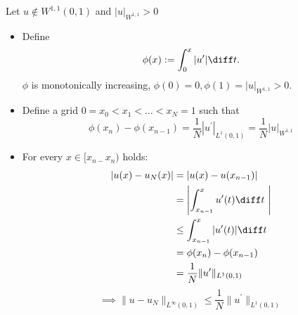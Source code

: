 \begin{example}
\begin{enumerate}[label = \Roman*)]
			Let $u \not \in W^{1,1}(0,1)$ and $|u|_{W^{1,1}}>0$
			\begin{itemize}
				\item Define
					\begin{equation*}
						\phi(x) := \int_{0}^x |u^\prime | \diff t.
					\end{equation*}
					$\phi$ is monotonically increasing, $\phi(0)=0,\phi(1)=|u|_{W^{1,1}} > 0$.
				\item Define a grid $0 = x_{0} < x_{1}< \dots < x_{N} = 1$ such that
					\begin{equation*}
						\phi(x_{n}) - \phi(x_{n-1}) = \frac{1}{N} |u^\prime|_{L^1(0,1)}= \frac{1}{N} |u|_{W^{1,1}}
					\end{equation*}
				\item For every $x \in [x_{n-}x_{n})$ holds:
					\begin{align*}
						|u(x)-u_{N}(x)|&= |u(x)-u(x_{n-1})|\\
									   &= \left| \int_{x_{n-1}}^{x} u^\prime(t) \diff t\ \right|\\
									   &\leq \int_{x_{n-1}}^{x} |u^\prime(t)| \diff t\\\
									   &= \phi(x_{n}) - \phi(x_{n-1}) \\
									   &= \frac{1}{N} \|u^\prime\|_{L^{1}(0,1)}						  
					\end{align*}
					\begin{equation*}
						\implies \|u - u_{N}\|_{L^{\infty}(0,1)} \leq \frac{1}{N} \|u^\prime\|_{L^{1}(0,1)}
					\end{equation*}
			\end{itemize}
	\end{enumerate}
\end{example}
